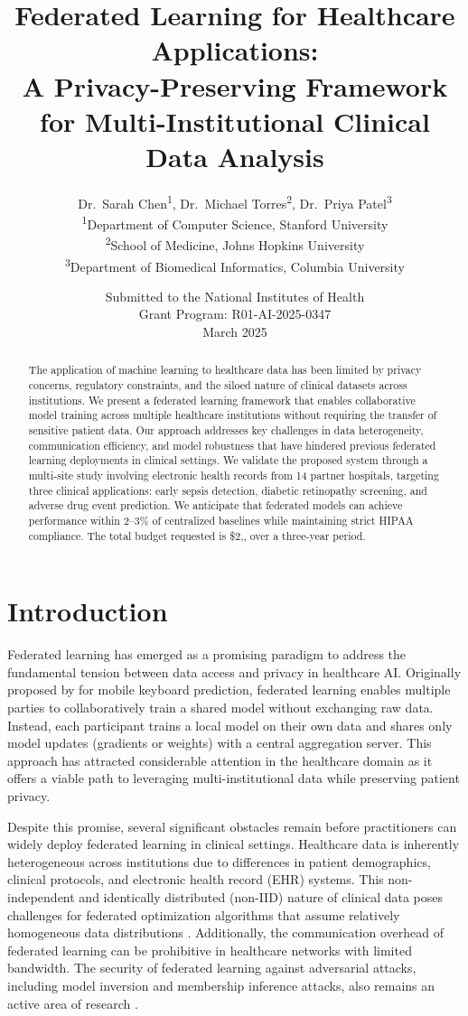 \documentclass[12pt,letterpaper]{article}
\title{\textbf{Federated Learning for Healthcare Applications: \\
A Privacy-Preserving Framework for Multi-Institutional Clinical Data Analysis}}
\author{
  Dr.\ Sarah Chen\textsuperscript{1}, Dr.\ Michael Torres\textsuperscript{2}, Dr.\ Priya Patel\textsuperscript{3} \\[6pt]
  \textsuperscript{1}Department of Computer Science, Stanford University \\
  \textsuperscript{2}School of Medicine, Johns Hopkins University \\
  \textsuperscript{3}Department of Biomedical Informatics, Columbia University
}
\date{Submitted to the National Institutes of Health \\
Grant Program: R01-AI-2025-0347 \\
March 2025}
\begin{document}
\maketitle

\begin{abstract}
The application of machine learning to healthcare data has been limited by privacy concerns, regulatory constraints, and the siloed nature of clinical datasets across institutions. We present a federated learning framework that enables collaborative model training across multiple healthcare institutions without requiring the transfer of sensitive patient data. Our approach addresses key challenges in data heterogeneity, communication efficiency, and model robustness that have hindered previous federated learning deployments in clinical settings. We validate the proposed system through a multi-site study involving electronic health records from 14 partner hospitals, targeting three clinical applications: early sepsis detection, diabetic retinopathy screening, and adverse drug event prediction. We anticipate that federated models can achieve performance within 2--3\% of centralized baselines while maintaining strict HIPAA compliance. The total budget requested is \$2,, over a three-year period.
\end{abstract}

\section{Introduction}
\label{sec:intro}

Federated learning has emerged as a promising paradigm to address the fundamental tension between data access and privacy in healthcare AI. Originally proposed by \citet{McMahan2017} for mobile keyboard prediction, federated learning enables multiple parties to collaboratively train a shared model without exchanging raw data. Instead, each participant trains a local model on their own data and shares only model updates (gradients or weights) with a central aggregation server. This approach has attracted considerable attention in the healthcare domain \citep{Rieke2020, Sheller2020, Dayan2021} as it offers a viable path to leveraging multi-institutional data while preserving patient privacy.

Despite this promise, several significant obstacles remain before practitioners can widely deploy federated learning in clinical settings. Healthcare data is inherently heterogeneous across institutions due to differences in patient demographics, clinical protocols, and electronic health record (EHR) systems. This non-independent and identically distributed (non-IID) nature of clinical data poses challenges for federated optimization algorithms that assume relatively homogeneous data distributions \citep{Li2020fedprox}. Additionally, the communication overhead of federated learning can be prohibitive in healthcare networks with limited bandwidth. The security of federated learning against adversarial attacks, including model inversion and membership inference attacks, also remains an active area of research \citep{Nasr2019, Carlini2021}.
\end{document}

